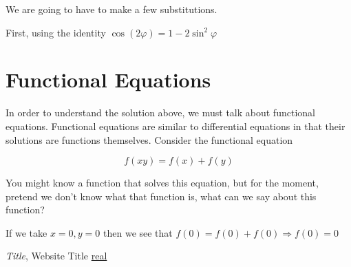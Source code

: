 \documentclass[11pt]{article}
\begin{document}
\vspace{5mm} We are going to have to make a few substitutions.

First, using the identity $\cos(2\varphi)=1-2\sin^2\varphi$

\section{Functional Equations}
In order to understand the solution above, we must talk about functional equations. Functional equations are similar to differential equations in that their solutions are functions themselves. Consider the functional equation

$$f(xy)=f(x)+f(y)$$

You might know a function that solves this equation, but for the moment, pretend we don't know what that function is, what can we say about this function?

\vspace{5mm} If we take $x=0,y=0$ then we see that $f(0)=f(0)+f(0)\Rightarrow f(0)=0$



\begin{thebibliography}{9}

\emph{Title}, Website Title
\url{real}

\end{thebibliography}
\end{document}
